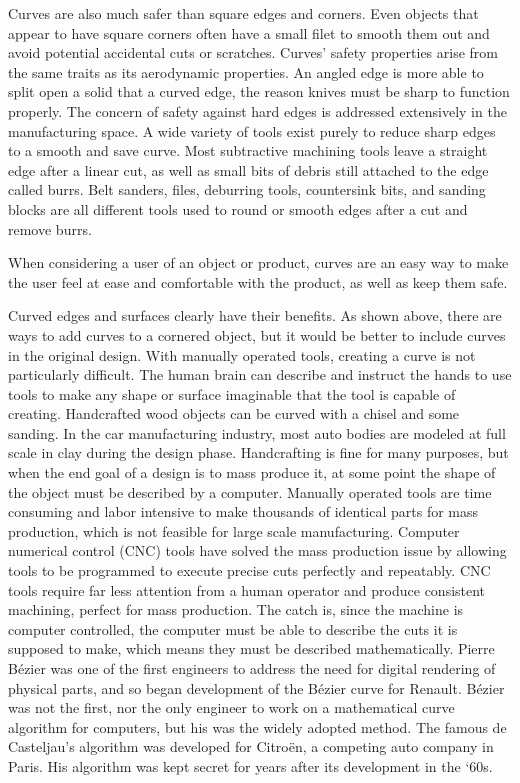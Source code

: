 \documentclass[12pt,letterpaper]{article}
\begin{document}
Curves are also much safer than square edges and corners. Even objects that appear to have square corners often have a small filet to smooth them out and avoid potential accidental cuts or scratches. Curves’ safety properties arise from the same traits as its aerodynamic properties. An angled edge is more able to split open a solid that a curved edge, the reason knives must be sharp to function properly. The concern of safety against hard edges is addressed extensively in the manufacturing space. A wide variety of tools exist purely to reduce sharp edges to a smooth and save curve. Most subtractive machining tools leave a straight edge after a linear cut, as well as small bits of debris still attached to the edge called burrs. Belt sanders, files, deburring tools, countersink bits, and sanding blocks are all different tools used to round or smooth edges after a cut and remove burrs.

When considering a user of an object or product, curves are an easy way to make the user feel at ease and comfortable with the product, as well as keep them safe. 

Curved edges and surfaces clearly have their benefits. As shown above, there are ways to add curves to a cornered object, but it would be better to include curves in the original design. With manually operated tools, creating a curve is not particularly difficult. The human brain can describe and instruct the hands to use tools to make any shape or surface imaginable that the tool is capable of creating. Handcrafted wood objects can be curved with a chisel and some sanding. In the car manufacturing industry, most auto bodies are modeled at full scale in clay during the design phase. Handcrafting is fine for many purposes, but when the end goal of a design is to mass produce it, at some point the shape of the object must be described by a computer. Manually operated tools are time consuming and labor intensive to make thousands of identical parts for mass production, which is not feasible for large scale manufacturing. Computer numerical control (CNC) tools have solved the mass production issue by allowing tools to be programmed to execute precise cuts perfectly and repeatably. CNC tools require far less attention from a human operator and produce consistent machining, perfect for mass production. The catch is, since the machine is computer controlled, the computer must be able to describe the cuts it is supposed to make, which means they must be described mathematically. Pierre B\'ezier was one of the first engineers to address the need for digital rendering of physical parts, and so began development of the B\'ezier curve for Renault. B\'ezier was not the first, nor the only engineer to work on a mathematical curve algorithm for computers, but his was the widely adopted method. The famous de Casteljau’s algorithm was developed for Citroën, a competing auto company in Paris. His algorithm was kept secret for years after its development in the ‘60s. \citep{handbook}
\end{document}
